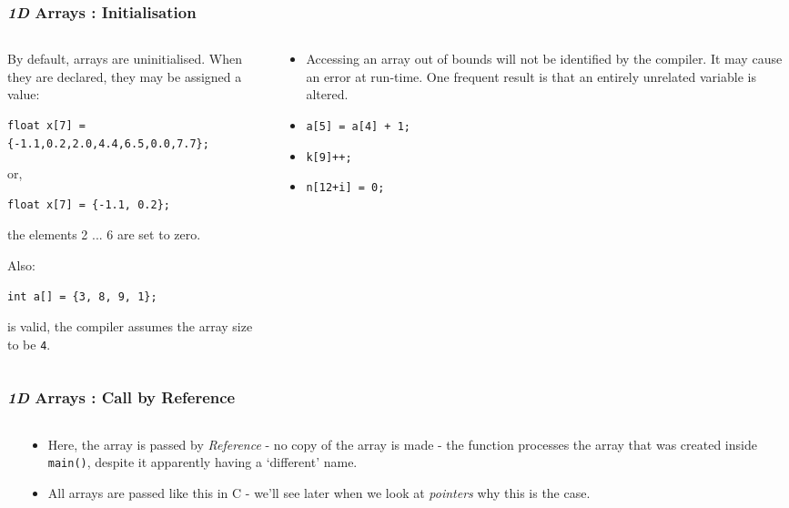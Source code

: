 
\begin{frame}[fragile]
\frametitle{{\em 1D} Arrays : Initialisation}

\begin{columns}

\begin{column}{0.45\textwidth}
By default, arrays are uninitialised.
When they are declared, they may be assigned a value:
{\small
\begin{verbatim}
float x[7] = {-1.1,0.2,2.0,4.4,6.5,0.0,7.7};
\end{verbatim}
}
or,
{\small
\begin{verbatim}
float x[7] = {-1.1, 0.2};
\end{verbatim}
}
the elements 2 ... 6 are set to zero.

Also:
{\small
\begin{verbatim}
int a[] = {3, 8, 9, 1};
\end{verbatim}
}
is valid, the compiler assumes the array size to be \verb^4^.
\end{column}

\pause
\begin{column}{0.45\textwidth}
\begin{itemize}
\item Accessing an array out of bounds will not be identified by
the compiler. It may cause an error at run-time.
One frequent result is that an entirely unrelated variable
is altered.
\item \verb^a[5] = a[4] + 1;^
\item \verb^k[9]++;^
\item \verb^n[12+i] = 0;^
\end{itemize}
\end{column}

\end{columns}
\end{frame}



\begin{frame}[fragile]
\frametitle{{\em 1D} Arrays : Call by Reference}
\begin{columns}

\begin{column}{0.55\textwidth}

\end{column}

\pause
\begin{column}{0.35\textwidth}
\begin{itemize}
\item Here, the array is passed by {\em Reference} - no copy of
the array is made - the function processes the array that was created inside \verb^main()^, despite
it apparently having a `different' name.
\item All arrays are passed like this in C - we'll see later when we look at {\em pointers} why this is the case.
\end{itemize}
\end{column}


\end{columns}
\end{frame}




